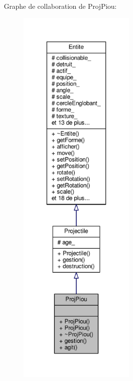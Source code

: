 Graphe de collaboration de Proj\+Piou\+:\nopagebreak
\begin{figure}[H]
\begin{center}
\leavevmode
\includegraphics[height=550pt]{class_proj_piou__coll__graph}
\end{center}
\end{figure}

